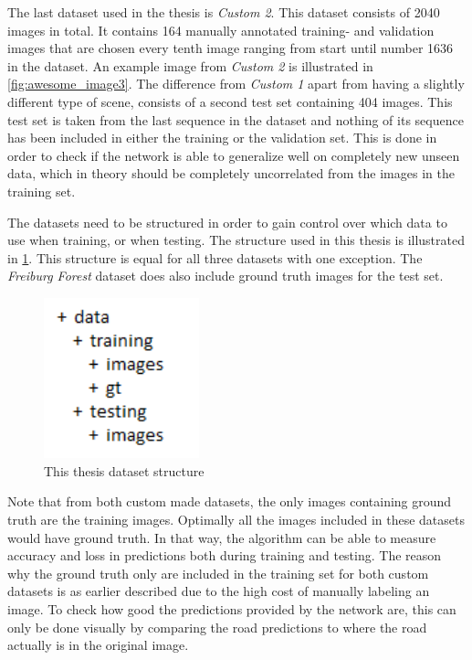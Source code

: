 \documentclass[USenglish]{ifimaster}  %
\begin{document}
The last dataset used in the thesis is \textit{Custom 2}. This dataset consists of 2040 images in total. It contains 164 manually annotated training- and validation images that are chosen every tenth image ranging from start until number 1636 in the dataset. An example image from \textit{Custom 2} is illustrated in \cref{fig:awesome_image3}. The difference from \textit{Custom 1} apart from having a slightly different type of scene, consists of a second test set containing 404 images. This test set is taken from the last sequence in the dataset and nothing of its sequence has been included in either the training or the validation set. This is done in order to check if the network is able to generalize well on completely new unseen data, which in theory should be completely uncorrelated from the images in the training set.

The datasets need to be structured in order to gain control over which data to use when training, or when testing. The structure used in this thesis is illustrated in \cref{fig:dataset_structure}. This structure is equal for all three datasets with one exception. The \textit{Freiburg Forest} dataset does also include ground truth images for the test set.

\begin{figure}[ht]
    \centering
    \includegraphics[width=0.4\textwidth]{bilder/dataset_structure.PNG}
    \caption{This thesis dataset structure}
    \label{fig:dataset_structure}
\end{figure}

Note that from both custom made datasets, the only images containing ground truth are the training images. Optimally all the images included in these datasets would have ground truth. In that way, the algorithm can be able to measure accuracy and loss in predictions both during training and testing. The reason why the ground truth only are included in the training set for both custom datasets is as earlier described due to the high cost of manually labeling an image. To check how good the predictions provided by the network are, this can only be done visually by comparing the road predictions to where the road actually is in the original image.
\end{document}
